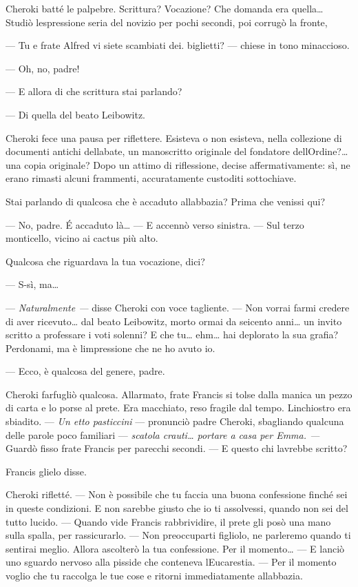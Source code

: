 Cheroki batté le palpebre. Scrittura? Vocazione? Che domanda era
quella\ldots{} Studiò l\textquotesingle espressione seria del novizio
per pochi secondi, poi corrugò la fronte,

--- Tu e frate Alfred vi siete scambiati dei. biglietti? --- chiese in
tono minaccioso.

--- Oh, no, padre!

--- E allora di che scrittura stai parlando?

--- Di quella del beato Leibowitz.

Cheroki fece una pausa per riflettere. Esisteva o non esisteva, nella
collezione di documenti antichi dell\textquotesingle abate, un
manoscritto originale del fondatore dell\textquotesingle Ordine?\ldots{}
una copia originale? Dopo un attimo di riflessione, decise
affermativamente: sì, ne erano rimasti alcuni frammenti, accuratamente
custoditi sottochiave.

Stai parlando di qualcosa che è accaduto all\textquotesingle abbazia?
Prima che venissi qui?

--- No, padre. É accaduto là\ldots{} --- E accennò verso sinistra. ---
Sul terzo monticello, vicino ai cactus più alto.

Qualcosa che riguardava la tua vocazione, dici?

--- S-sì, ma\ldots{}

--- \emph{Naturalmente ---} disse Cheroki con voce tagliente. --- Non
vorrai farmi credere di aver ricevuto\ldots{} dal beato Leibowitz, morto
ormai da seicento anni\ldots{} un invito scritto a professare i voti
solenni? E che tu\ldots{} ehm\ldots{} hai deplorato la sua grafia?
Perdonami, ma è l\textquotesingle impressione che ne ho avuto io.

--- Ecco, è qualcosa del genere, padre.

Cheroki farfugliò qualcosa. Allarmato, frate Francis si tolse dalla
manica un pezzo di carta e lo porse al prete. Era macchiato, reso
fragile dal tempo. L\textquotesingle inchiostro era sbiadito. ---
\emph{Un etto pasticcini} --- pronunciò padre Cheroki, sbagliando
qualcuna delle parole poco familiari --- \emph{scatola crauti\ldots{}
	portare a casa per Emma. ---} Guardò fisso frate Francis per parecchi
secondi. --- E questo chi l\textquotesingle avrebbe scritto?

Francis glielo disse.

Cheroki rifletté. --- Non è possibile che tu faccia una buona
confessione finché sei in queste condizioni. E non sarebbe giusto che io
ti assolvessi, quando non sei del tutto lucido. --- Quando vide Francis
rabbrividire, il prete gli posò una mano sulla spalla, per rassicurarlo.
--- Non preoccuparti figliolo, ne parleremo quando ti sentirai meglio.
Allora ascolterò la tua confessione. Per il momento\ldots{} --- E lanciò
uno sguardo nervoso alla pisside che conteneva
l\textquotesingle Eucarestia. --- Per il momento voglio che tu raccolga
le tue cose e ritorni immediatamente all\textquotesingle abbazia.

